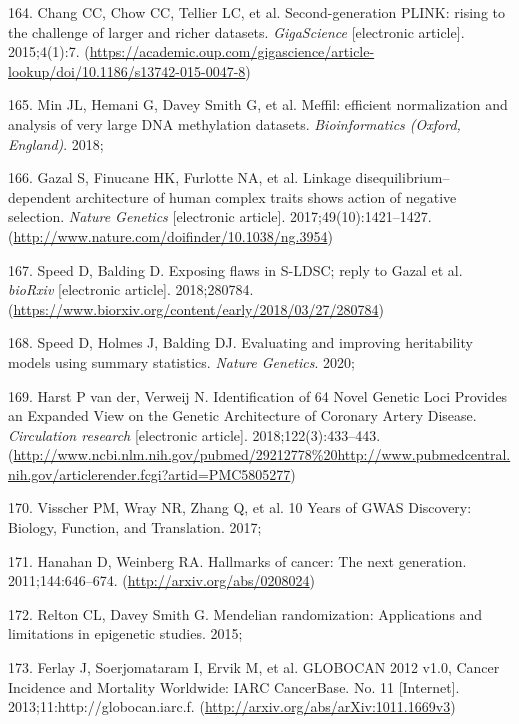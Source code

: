 \documentclass[11pt,oneside]{bristolthesis}
\newenvironment{cslreferences}%
  {}%
  {\par}
\begin{document}
\begin{cslreferences}
\leavevmode\hypertarget{ref-Chang2015}{}%
164. Chang CC, Chow CC, Tellier LC, et al. Second-generation PLINK: rising to the challenge of larger and richer datasets. \emph{GigaScience} {[}electronic article{]}. 2015;4(1):7. (\url{https://academic.oup.com/gigascience/article-lookup/doi/10.1186/s13742-015-0047-8})

\leavevmode\hypertarget{ref-Min2018}{}%
165. Min JL, Hemani G, Davey Smith G, et al. Meffil: efficient normalization and analysis of very large DNA methylation datasets. \emph{Bioinformatics (Oxford, England)}. 2018;

\leavevmode\hypertarget{ref-Gazal2017}{}%
166. Gazal S, Finucane HK, Furlotte NA, et al. Linkage disequilibrium--dependent architecture of human complex traits shows action of negative selection. \emph{Nature Genetics} {[}electronic article{]}. 2017;49(10):1421--1427. (\url{http://www.nature.com/doifinder/10.1038/ng.3954})

\leavevmode\hypertarget{ref-Speed2018}{}%
167. Speed D, Balding D. Exposing flaws in S-LDSC; reply to Gazal et al. \emph{bioRxiv} {[}electronic article{]}. 2018;280784. (\url{https://www.biorxiv.org/content/early/2018/03/27/280784})

\leavevmode\hypertarget{ref-Speed2020}{}%
168. Speed D, Holmes J, Balding DJ. Evaluating and improving heritability models using summary statistics. \emph{Nature Genetics}. 2020;

\leavevmode\hypertarget{ref-VanderHarst2018}{}%
169. Harst P van der, Verweij N. Identification of 64 Novel Genetic Loci Provides an Expanded View on the Genetic Architecture of Coronary Artery Disease. \emph{Circulation research} {[}electronic article{]}. 2018;122(3):433--443. (\url{http://www.ncbi.nlm.nih.gov/pubmed/29212778\%20http://www.pubmedcentral.nih.gov/articlerender.fcgi?artid=PMC5805277})

\leavevmode\hypertarget{ref-Visscher2017}{}%
170. Visscher PM, Wray NR, Zhang Q, et al. 10 Years of GWAS Discovery: Biology, Function, and Translation. 2017;

\leavevmode\hypertarget{ref-Hanahan2011}{}%
171. Hanahan D, Weinberg RA. Hallmarks of cancer: The next generation. 2011;144:646--674. (\url{http://arxiv.org/abs/0208024})

\leavevmode\hypertarget{ref-Relton2015}{}%
172. Relton CL, Davey Smith G. Mendelian randomization: Applications and limitations in epigenetic studies. 2015;

\leavevmode\hypertarget{ref-Ferlay2013}{}%
173. Ferlay J, Soerjomataram I, Ervik M, et al. GLOBOCAN 2012 v1.0, Cancer Incidence and Mortality Worldwide: IARC CancerBase. No. 11 {[}Internet{]}. 2013;11:http://globocan.iarc.f. (\url{http://arxiv.org/abs/arXiv:1011.1669v3})


\end{cslreferences}
\end{document}
